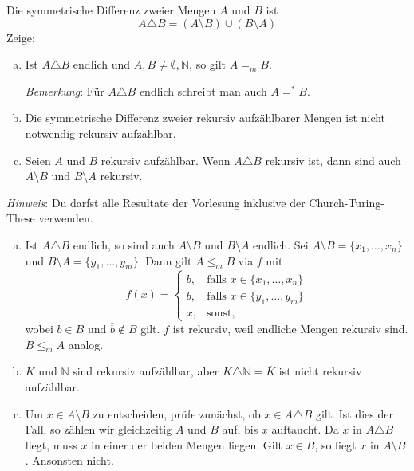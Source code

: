 \documentclass[german,headsepline]{scrartcl}
\begin{document}
	\begin{question}
		Die symmetrische Differenz zweier Mengen $A$ und $B$ ist
		\[A\triangle B=(A\setminus B)\cup(B\setminus A)\]
		Zeige:
		\begin{enumerate}[(a)]
			\item Ist $A\triangle B$ endlich und $A,B\neq\emptyset,\mathbb{N}$, so gilt $A=_mB$.
				
				\textit{Bemerkung}: Für $A\triangle B$ endlich schreibt man auch $A=^*B$.
			\item Die symmetrische Differenz zweier rekursiv aufzählbarer Mengen ist nicht notwendig rekursiv aufzählbar.
			\item Seien $A$ und $B$ rekursiv aufzählbar.
				Wenn $A\triangle B$ rekursiv ist, dann sind auch $A\setminus B$ und $B\setminus A$ rekursiv.
		\end{enumerate}
		\textit{Hinweis}: Du darfst alle Resultate der Vorlesung inklusive der Church-Turing-These verwenden.
	\end{question}
	\begin{solution}
		\begin{enumerate}[(a)]
			\item Ist $A\triangle B$ endlich, so sind auch $A\setminus B$ und $B\setminus A$ endlich.
				Sei $A\setminus B=\{x_1,\dots,x_n\}$ und $B\setminus A=\{y_1,\dots,y_m\}$.
				Dann gilt $A\leq_mB$ via $f$ mit
				\[f(x)=\begin{cases}
					\overline{b}, &\text{falls }x\in\{x_1,\dots,x_n\} \\
					b, &\text{falls }x\in\{y_1,\dots,y_m\} \\
					x, &\text{sonst,}
				\end{cases}\]
				wobei $b\in B$ und $\overline{b}\notin B$ gilt.
				$f$ ist rekursiv, weil endliche Mengen rekursiv sind. $B\leq_mA$ analog.
			\item $K$ und $\mathbb{N}$ sind rekursiv aufzählbar,
				aber $K\triangle\mathbb{N}=\overline{K}$ ist nicht rekursiv aufzählbar.
			\item Um $x\in A\setminus B$ zu entscheiden, prüfe zunächst, ob $x\in A\triangle B$ gilt.
				Ist dies der Fall, so zählen wir gleichzeitig $A$ und $B$ auf, bis $x$ auftaucht.
				Da $x$ in $A\triangle B$ liegt, muss $x$ in einer der beiden Mengen liegen.
				Gilt $x\in B$, so liegt $x$ in $A\setminus B$. Ansonsten nicht.
		\end{enumerate}
	\end{solution}
	
\end{document}
